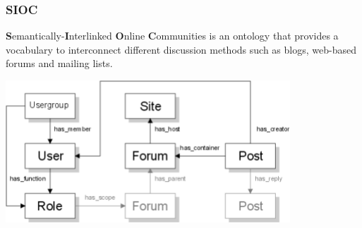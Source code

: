 \documentclass[spanish,notes=hide]{beamer}
\begin{document}
{
  \frametitle{SIOC}

  \begin{Large}
    \textbf{S}emantically-\textbf{I}nterlinked \textbf{O}nline \textbf{C}ommunities 
    is an ontology that provides a vocabulary to interconnect different discussion 
    methods such as blogs, web-based forums and mailing lists.
  \end{Large}

  \begin{center}
    \includegraphics[width=0.8\textwidth]{images/sioc-terms.png}
  \end{center}

}
\end{document}
